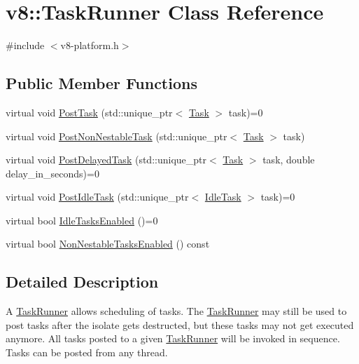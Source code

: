 \hypertarget{classv8_1_1TaskRunner}{}\section{v8\+:\+:Task\+Runner Class Reference}
\label{classv8_1_1TaskRunner}


{\ttfamily \#include $<$v8-\/platform.\+h$>$}

\subsection*{Public Member Functions}
\begin{DoxyCompactItemize}
\item 
virtual void \mbox{\hyperlink{classv8_1_1TaskRunner_a755795cc77383daf067a17673569c685}{Post\+Task}} (std\+::unique\+\_\+ptr$<$ \mbox{\hyperlink{classv8_1_1Task}{Task}} $>$ task)=0
\item 
virtual void \mbox{\hyperlink{classv8_1_1TaskRunner_ab2b73f380765e09c9ae401182a92d8e9}{Post\+Non\+Nestable\+Task}} (std\+::unique\+\_\+ptr$<$ \mbox{\hyperlink{classv8_1_1Task}{Task}} $>$ task)
\item 
virtual void \mbox{\hyperlink{classv8_1_1TaskRunner_a8ae45842086210292d966e2e326629a4}{Post\+Delayed\+Task}} (std\+::unique\+\_\+ptr$<$ \mbox{\hyperlink{classv8_1_1Task}{Task}} $>$ task, double delay\+\_\+in\+\_\+seconds)=0
\item 
virtual void \mbox{\hyperlink{classv8_1_1TaskRunner_a0ebfb362d1cb3fa621f0f50b9ff0fb6f}{Post\+Idle\+Task}} (std\+::unique\+\_\+ptr$<$ \mbox{\hyperlink{classv8_1_1IdleTask}{Idle\+Task}} $>$ task)=0
\item 
virtual bool \mbox{\hyperlink{classv8_1_1TaskRunner_aa8a6077bed5735e2190918685faf20f5}{Idle\+Tasks\+Enabled}} ()=0
\item 
virtual bool \mbox{\hyperlink{classv8_1_1TaskRunner_a7042a9967ddaaf1f995e568c3dd7ce64}{Non\+Nestable\+Tasks\+Enabled}} () const
\end{DoxyCompactItemize}


\subsection{Detailed Description}
A \mbox{\hyperlink{classv8_1_1TaskRunner}{Task\+Runner}} allows scheduling of tasks. The \mbox{\hyperlink{classv8_1_1TaskRunner}{Task\+Runner}} may still be used to post tasks after the isolate gets destructed, but these tasks may not get executed anymore. All tasks posted to a given \mbox{\hyperlink{classv8_1_1TaskRunner}{Task\+Runner}} will be invoked in sequence. Tasks can be posted from any thread. 

